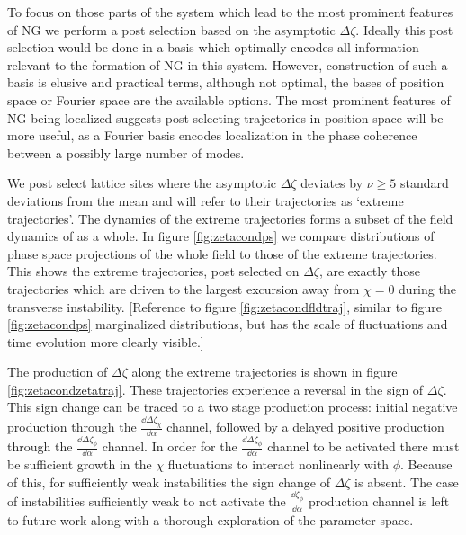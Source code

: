 To focus on those parts of the system which lead to the most prominent features of NG we perform a post selection based on the asymptotic $\Delta\zeta$.
Ideally this post selection would be done in a basis which optimally encodes all information relevant to the formation of NG in this system.
However, construction of such a basis is elusive and practical terms, although not optimal, the bases of position space or Fourier space are the available options. 
The most prominent features of NG being localized suggests post selecting trajectories in position space will be more useful, as a Fourier basis encodes localization in the phase coherence between a possibly large number of modes.

We post select lattice sites where the asymptotic $\Delta\zeta$ deviates by $\nu \ge 5$ standard deviations from the mean and will refer to their trajectories as `extreme trajectories'.
The dynamics of the extreme trajectories forms a subset of the field dynamics of as a whole.
In figure \ref{fig:zetacondps} we compare distributions of phase space projections of the whole field to those of the extreme trajectories.
This shows the extreme trajectories, post selected on $\Delta\zeta$, are exactly those trajectories which are driven to the largest excursion away from $\chi=0$ during the transverse instability.
[Reference to figure \ref{fig:zetacondfldtraj}, similar to figure \ref{fig:zetacondps} marginalized distributions, but has the scale of fluctuations and time evolution more clearly visible.]


The production of $\Delta\zeta$ along the extreme trajectories is shown in figure \ref{fig:zetacondzetatraj}.
These trajectories experience a reversal in the sign of $\Delta\zeta$.
This sign change can be traced to a two stage production process: initial negative production through the $\frac{\dd\Delta\zeta_\chi}{\dd\alpha}$ channel, followed by a delayed positive production through the $\frac{\dd\Delta\zeta_\phi}{\dd\alpha}$ channel.
In order for the $\frac{\dd\Delta\zeta_\phi}{\dd\alpha}$ channel to be activated there must be sufficient growth in the $\chi$ fluctuations to interact nonlinearly with $\phi$.
Because of this, for sufficiently weak instabilities the sign change of $\Delta\zeta$ is absent.
The case of instabilities sufficiently weak to not activate the $\frac{\dd\zeta_\phi}{\dd\alpha}$ production channel is left to future work along with a thorough exploration of the parameter space.

